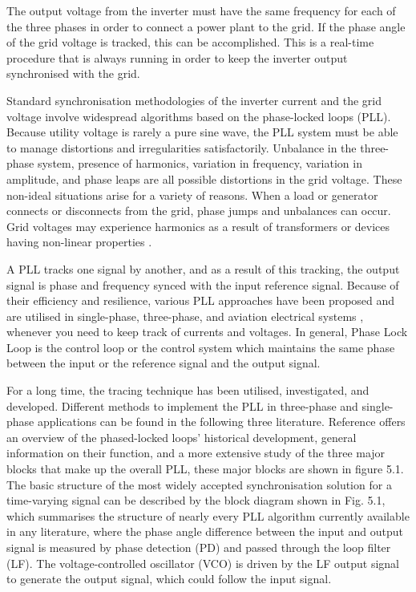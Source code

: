 \documentclass[a4paper,12pt]{iitmdiss}
\begin{document}
The output voltage from the inverter must have the same frequency for each of the three phases in order to connect a power plant to the grid. If the phase angle of the grid voltage is tracked, this can be accomplished. This is a real-time procedure that is always running in order to keep the inverter output synchronised with the grid. 

Standard synchronisation methodologies of the inverter current and the grid voltage involve widespread algorithms based on the phase-locked loops (PLL). Because utility voltage is rarely a pure sine wave, the PLL system must be able to manage distortions and irregularities satisfactorily.
Unbalance in the three-phase system, presence of harmonics, variation in frequency, variation in amplitude, and phase leaps are all possible distortions in the grid voltage. These non-ideal situations arise for a variety of reasons. When a load or generator connects or disconnects from the grid, phase jumps and unbalances can occur. Grid voltages may experience harmonics as a result of transformers or devices having non-linear properties \cite{schlabbach2001voltage}.

A PLL tracks one signal by another, and as a result of this tracking, the output signal is phase and frequency synced with the input reference signal. Because of their efficiency and resilience, various PLL approaches have been proposed and are utilised in single-phase, three-phase, and aviation electrical systems \cite{cupertino2010running}, whenever you need to keep track of currents and voltages. In general, Phase Lock Loop is the control loop or the control system which maintains the same phase between the input or the reference signal and the output signal.  

For a long time, the tracing technique has been utilised, investigated, and developed. Different methods to implement the PLL in three-phase and single-phase applications can be found in the following three literature.  Reference \cite{hsieh1996phase} \cite{guo2011phase} \cite{devi2015phase} offers an overview of the phased-locked loops' historical development, general information on their function, and a more extensive study of the three major blocks that make up the overall PLL, these major blocks are shown in figure 5.1. The basic structure of the most widely accepted synchronisation solution for a time-varying signal can be described by the block diagram shown in Fig. 5.1, which summarises the structure of nearly every PLL algorithm currently available in any literature, where the phase angle difference between the input and output signal is measured by phase detection (PD) and passed through the loop filter (LF). The voltage-controlled oscillator (VCO) is driven by the LF output signal to generate the output signal, which could follow the input signal.  
\end{document}
